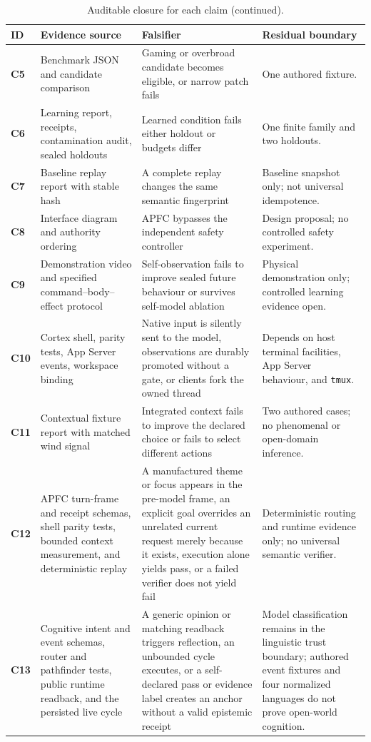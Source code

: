 \documentclass[10pt,twocolumn]{article}
\theoremstyle{definition}
\theoremstyle{plain}
\theoremstyle{remark}
\newcommand{\file}[1]{\nolinkurl{#1}}
\newcommand{\claimid}[1]{\textsf{\textbf{#1}}}
\begin{document}
\begin{table}[!t]
\ContinuedFloat
\centering
\caption{Auditable closure for each claim (continued).}
\scriptsize
\begin{tabularx}{\textwidth}{@{}p{}p{}p{}X@{}}
\toprule
ID & Evidence source & Falsifier & Residual boundary \\
\midrule
\claimid{C5} & Benchmark JSON and candidate comparison & Gaming or overbroad candidate becomes eligible, or narrow patch fails & One authored fixture. \\
\claimid{C6} & Learning report, receipts, contamination audit, sealed holdouts & Learned condition fails either holdout or budgets differ & One finite family and two holdouts. \\
\claimid{C7} & Baseline replay report with stable hash & A complete replay changes the same semantic fingerprint & Baseline snapshot only; not universal idempotence. \\
\claimid{C8} & Interface diagram and authority ordering & APFC bypasses the independent safety controller & Design proposal; no controlled safety experiment. \\
\claimid{C9} & Demonstration video and specified command--body--effect protocol & Self-observation fails to improve sealed future behaviour or survives self-model ablation & Physical demonstration only; controlled learning evidence open. \\
\claimid{C10} & Cortex shell, parity tests, App Server events, workspace binding & Native input is silently sent to the model, observations are durably promoted without a gate, or clients fork the owned thread & Depends on host terminal facilities, App Server behaviour, and \file{tmux}. \\
\claimid{C11} & Contextual fixture report with matched wind signal & Integrated context fails to improve the declared choice or fails to select different actions & Two authored cases; no phenomenal or open-domain inference. \\
\claimid{C12} & APFC turn-frame and receipt schemas, shell parity tests, bounded context measurement, and deterministic replay & A manufactured theme or focus appears in the pre-model frame, an explicit goal overrides an unrelated current request merely because it exists, execution alone yields pass, or a failed verifier does not yield fail & Deterministic routing and runtime evidence only; no universal semantic verifier. \\
\claimid{C13} & Cognitive intent and event schemas, router and pathfinder tests, public runtime readback, and the persisted live cycle & A generic opinion or matching readback triggers reflection, an unbounded cycle executes, or a self-declared pass or evidence label creates an anchor without a valid epistemic receipt & Model classification remains in the linguistic trust boundary; authored event fixtures and four normalized languages do not prove open-world cognition. \\

\end{tabularx}
\end{table}
\end{document}
